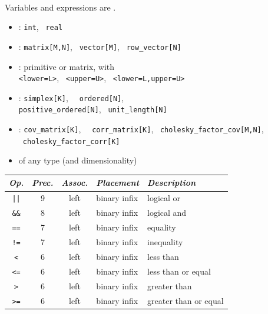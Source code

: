 \documentclass[10pt]{report}
\newcommand{\sld}[1]{\newpage{\noindent\LARGE \ \ \
    \textcolor{MidnightBlue}{\bfseries #1}}\vspace*{4pt}}
\newcommand{\code}[1]{{\tt #1}}
\newcommand{\spc}{\hspace*{0.25in}}
\newcommand{\myemph}[1]{{\color{MidnightBlue}{\bfseries #1}}}
\begin{document}
\sld{Variable and Expression Types}
\\[3pt]
\hspace*{17pt}Variables and expressions are \myemph{strongly, statically typed}.
\begin{itemize}
\item \myemph{Primitive}: {\tt\small int}, \ {\tt\small real}
\item \myemph{Matrix}: {\tt\small matrix[M,N]}, \ {\tt\small vector[M]}, \ {\tt\small row\_vector[N]}
\item \myemph{Bounded}: primitive or matrix, with 
\\ {\tt\small <lower=L>}, \ {\tt\small <upper=U>}, \ {\tt\small <lower=L,upper=U>}
\item \myemph{Constrained Vectors}: {\tt\small simplex[K]}, \ {\tt\small
    ordered[N]},
\\ {\tt\small positive\_ordered[N]}, \ {\tt\small unit\_length[N]}
\item \myemph{Constrained Matrices}: {\tt\small cov\_matrix[K]}, \ {\tt\small
    corr\_matrix[K]}, \ {\tt\small cholesky\_factor\_cov[M,N]}, \
  {\tt\small cholesky\_factor\_corr[K]}
\item \myemph{Arrays:}  of any type (and dimensionality)
\end{itemize}

\sld{Logical Operators}
\vfill
\noindent\spc
{\footnotesize
\begin{tabular}{c|ccl|l}
{\it Op.} & {\it Prec.} & {\it Assoc.} & {\it
  Placement} & {\it Description}
\\ \hline \hline
\code{||} & 9 & left & binary infix & logical or
\\ \hline
\Verb|&&| & 8 & left & binary infix & logical and
\\ \hline
\Verb|==| & 7 & left & binary infix & equality
\\
\Verb|!=| & 7 & left & binary infix & inequality
\\ \hline
\Verb|<| & 6 & left & binary infix & less than
\\
\Verb|<=| & 6 & left & binary infix & less than or equal
\\
\Verb|>| & 6 & left & binary infix & greater than 
\\
\Verb|>=| & 6 & left & binary infix & greater than or equal
\end{tabular}
}
\vfill
\vfill
\end{document}
